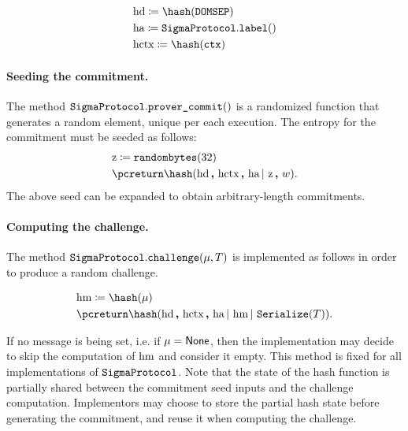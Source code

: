 \documentclass[11pt]{article}
\begin{document}
\[
  \begin{aligned}
   & \hd \defeq \hash(\domsep) \\
   & \hstatement \defeq \sigmaprotocol.\labeltt() \\
   & \hctx \defeq \hash(\ctx)
  \end{aligned}
\]
\paragraph{Seeding the commitment.} The method $\texttt{SigmaProtocol}.\texttt{prover\_commit}()$ is a randomized function that generates a random element, unique per each execution. The entropy for the commitment must be seeded as follows:
\[
    \begin{aligned}
     & \hz \defeq \randombytes(32) \\
    & \pcreturn  \hash(\hd \concat \hctx \concat \hstatement \concatblock \hz\concat \witness).
    \end{aligned}
    \]
The above seed can be expanded to obtain arbitrary-length commitments.
\paragraph{Computing the challenge.}
The method $\texttt{SigmaProtocol}.\texttt{challenge}(\mu, T)$ is implemented as follows in order to produce a random challenge.

  \[
    \begin{aligned}
     & \hmsg \defeq \hash(\msg) \\
    & \pcreturn  \hash(\hd \concat \hctx \concat \hstatement \concatblock \hmsg \concatblock  \serialize(\commitment)).
    \end{aligned}
  \]

If no message is being set, i.e. if $\mu = \mathsf{None}$, then the implementation may decide to skip the computation of $\text{hm}$ and consider it empty.
This method is fixed for all implementations of $\texttt{SigmaProtocol}$. Note that the state of the hash function is partially shared between the commitment seed inputs and the challenge computation. Implementors may choose to store the partial hash state before generating the commitment, and reuse it when computing the challenge.


\end{document}
